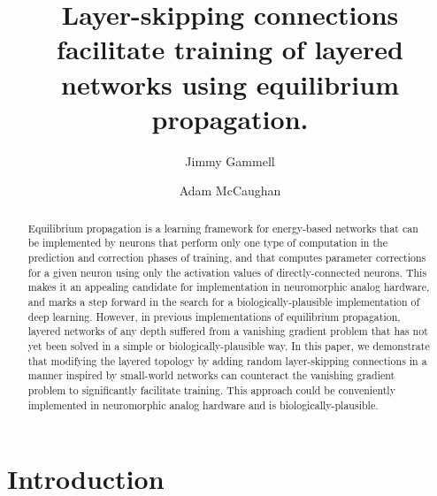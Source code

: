 \documentclass[format=sigconf]{acmart}
\title{Layer-skipping connections facilitate training of layered networks using equilibrium propagation.}
\author{Jimmy Gammell}
\author{Adam McCaughan}
\begin{document}
\begin{abstract}

Equilibrium propagation is a learning framework for energy-based networks that can be implemented by neurons that perform only one type of computation in the prediction and correction phases of training, and that computes parameter corrections for a given neuron using only the activation values of directly-connected neurons. This makes it an appealing candidate for implementation in neuromorphic analog hardware, and marks a step forward in the search for a biologically-plausible implementation of deep learning. However, in previous implementations of equilibrium propagation, layered networks of any depth suffered from a vanishing gradient problem that has not yet been solved in a simple or biologically-plausible way. In this paper, we demonstrate that modifying the layered topology by adding random layer-skipping connections in a manner inspired by small-world networks can counteract the vanishing gradient problem to significantly facilitate training. This approach could be conveniently implemented in neuromorphic analog hardware and is biologically-plausible.

\end{abstract}

\maketitle

\section{Introduction}
\end{document}
